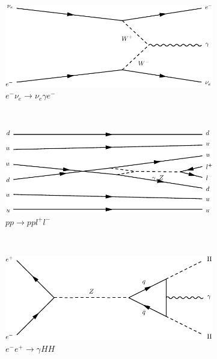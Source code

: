 \begin{figure}[h]
  \newline
  \begin{subfigure}[b]{0.3\textwidth}
    \includegraphics[width=\textwidth]{../dia/07.pdf}
    \caption{$e^-\nu_e\rightarrow \nu_e \gamma e^-$}
    \label{fey:7}
  \end{subfigure}%
  ~
  \begin{subfigure}[b]{0.3\textwidth}
    \includegraphics[width=\textwidth]{../dia/08.pdf}
    \caption{$pp\rightarrow ppl^+l^-$}
    \label{fey:8}
  \end{subfigure}%
  ~
  \begin{subfigure}[b]{0.3\textwidth}
    \includegraphics[width=\textwidth]{../dia/09.pdf}
    \caption{$e^-e^+ \rightarrow \gamma HH$}
    \label{fey:9}
  \end{subfigure}
  \newline
  \newline
  \begin{subfigure}[b]{0.3\textwidth}

\end{subfigure}
\end{figure}
